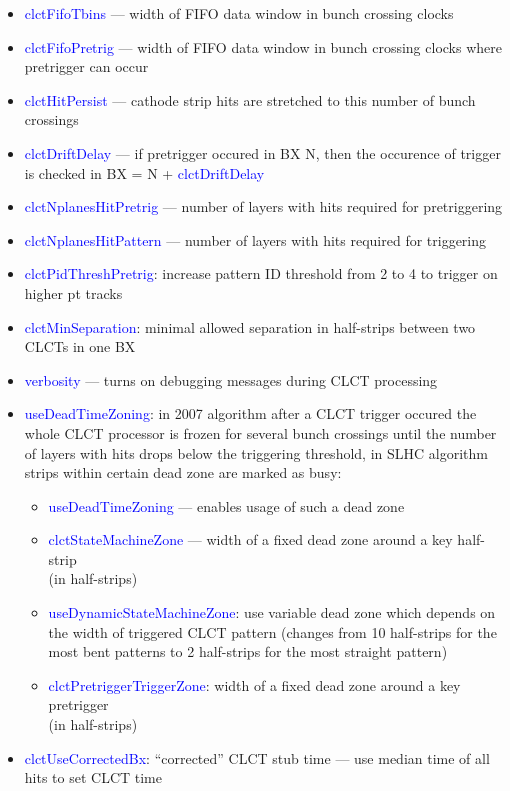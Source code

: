 \begin{itemize}	
	\item \textcolor{blue}{clctFifoTbins} --- width of FIFO data window in bunch crossing clocks
	\item \textcolor{blue}{clctFifoPretrig} --- width of FIFO data window in bunch crossing clocks where pretrigger can occur
	\item \textcolor{blue}{clctHitPersist} --- cathode strip hits are stretched to this number of bunch crossings
	\item \textcolor{blue}{clctDriftDelay} --- if pretrigger occured in BX N, then the occurence of trigger is checked in BX = N + \textcolor{blue}{clctDriftDelay}
	\item \textcolor{blue}{clctNplanesHitPretrig} --- number of layers with hits required for pretriggering
	\item \textcolor{blue}{clctNplanesHitPattern} --- number of layers with hits required for triggering
	\item \textcolor{blue}{clctPidThreshPretrig}: increase pattern ID threshold from 2 to 4 to trigger on higher pt tracks
	\item \textcolor{blue}{clctMinSeparation}: minimal allowed separation in half-strips between two CLCTs in one BX
	\item \textcolor{blue}{verbosity} --- turns on debugging messages during CLCT processing
	\item \textcolor{blue}{useDeadTimeZoning}: in 2007 algorithm after a CLCT trigger occured the whole CLCT processor is frozen for several bunch crossings 
	until the number of layers with hits drops below the triggering threshold, in SLHC algorithm strips within certain dead zone are marked as busy:
	\begin{itemize}
		\item \textcolor{blue}{useDeadTimeZoning} --- enables usage of such a dead zone
		\item \textcolor{blue}{clctStateMachineZone} --- width of a fixed dead zone around a key half-strip \\ (in half-strips)
		\item \textcolor{blue}{useDynamicStateMachineZone}: use variable dead zone which depends on the width of triggered CLCT pattern 
		(changes from 10 half-strips for the most bent patterns to 2 half-strips for the most straight pattern)
		\item \textcolor{blue}{clctPretriggerTriggerZone}: width of a fixed dead zone around a key pretrigger \\ (in half-strips)
	\end{itemize}
	\item \textcolor{blue}{clctUseCorrectedBx}: ``corrected'' CLCT stub time --- use median time of all hits to set CLCT time
\end{itemize}

